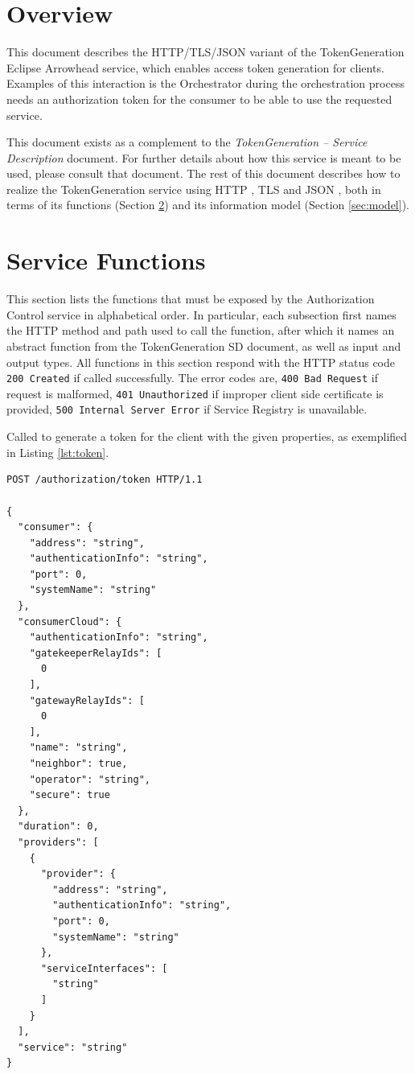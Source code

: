 \documentclass[a4paper]{arrowhead}
\newcommand{\fref}[1]{{\textcolor{ArrowheadBlue}{\hyperref[sec:functions:#1]{#1}}}}
\begin{document}
\section{Overview}
\label{sec:overview}

This document describes the HTTP/TLS/JSON variant of the TokenGeneration Eclipse Arrowhead service, which enables access token generation for clients.
Examples of this interaction is the Orchestrator during the orchestration process needs an authorization token for the consumer to be able to use the requested service. 

This document exists as a complement to the \textit{TokenGeneration -- Service Description} document.
For further details about how this service is meant to be used, please consult that document.
The rest of this document describes how to realize the TokenGeneration service using HTTP \cite{fielding2014hypertext}, TLS \cite{rescorla2018transport} and JSON \cite{bray2014json}, both in terms of its functions (Section \ref{sec:functions}) and its information model (Section \ref{sec:model}).

\newpage

\section{Service Functions}
\label{sec:functions}

This section lists the functions that must be exposed by the Authorization Control service in alphabetical order.
In particular, each subsection first names the HTTP method and path used to call the function, after which it names an abstract function from the TokenGeneration SD document, as well as input and output types.
All functions in this section respond with the HTTP status code \texttt{200 Created} if called successfully. The error codes are, \texttt{400 Bad Request} if request is malformed, \texttt{401 Unauthorized} if improper client side certificate is provided, \texttt{500 Internal Server Error} if Service Registry is unavailable.


Called to generate a token for the client with the given properties, as exemplified in Listing \ref{lst:token}.

\begin{lstlisting}[language=http,label={lst:token},caption={An \fref{Token} invocation response.}]
POST /authorization/token HTTP/1.1

{
  "consumer": {
    "address": "string",
    "authenticationInfo": "string",
    "port": 0,
    "systemName": "string"
  },
  "consumerCloud": {
    "authenticationInfo": "string",
    "gatekeeperRelayIds": [
      0
    ],
    "gatewayRelayIds": [
      0
    ],
    "name": "string",
    "neighbor": true,
    "operator": "string",
    "secure": true
  },
  "duration": 0,
  "providers": [
    {
      "provider": {
        "address": "string",
        "authenticationInfo": "string",
        "port": 0,
        "systemName": "string"
      },
      "serviceInterfaces": [
        "string"
      ]
    }
  ],
  "service": "string"
}

\end{lstlisting}
\end{document}
